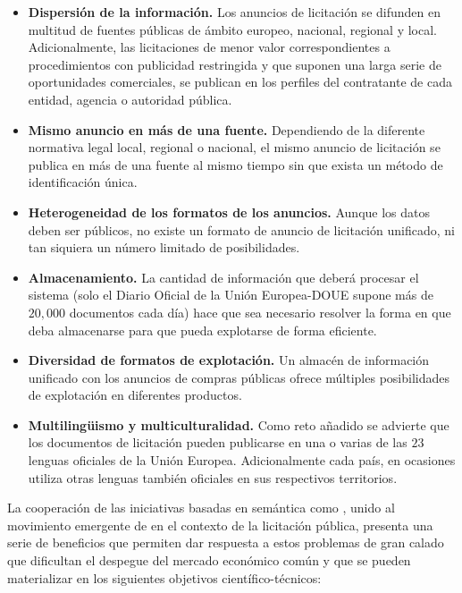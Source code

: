 \documentclass[a4paper,final,11pt,fleqn,twoside]{book}  %
\begin{document}
\begin{itemize}
\item \textbf{Dispersión de la información.} Los anuncios de licitación se difunden en multitud de fuentes
públicas de ámbito europeo, nacional, regional y local. Adicionalmente, las licitaciones de menor
valor correspondientes a procedimientos con publicidad restringida y que suponen una larga
serie de oportunidades comerciales, se publican en los perfiles del contratante de cada
entidad, agencia o autoridad pública. 

\item \textbf{Mismo anuncio en más de una fuente.} Dependiendo de la diferente normativa legal local,
regional o nacional, el mismo anuncio de licitación se publica en más de una fuente al
mismo tiempo sin que exista un método de identificación única.

\item \textbf{Heterogeneidad de los formatos de los anuncios.} Aunque los datos deben ser públicos, no
existe un formato de anuncio de licitación unificado, ni tan siquiera un número limitado de
posibilidades.

\item \textbf{Almacenamiento.} La cantidad de información que deberá procesar el sistema (solo el Diario
Oficial de la Unión Europea-DOUE supone más de $20,000$ documentos cada día) hace que sea necesario resolver la forma en que
deba almacenarse para que pueda explotarse de forma eficiente.

\item \textbf{Diversidad de formatos de explotación.} Un almacén de información unificado con los
anuncios de compras públicas ofrece múltiples posibilidades de explotación en diferentes
productos. 

\item \textbf{Multiling\"{u}ismo y multiculturalidad.} Como reto añadido se advierte que los documentos de
licitación pueden publicarse en una o varias de las $23$ lenguas oficiales de la Unión Europea.
Adicionalmente cada país, en ocasiones utiliza otras lenguas también oficiales en sus respectivos territorios. 
\end{itemize}

La cooperación de las iniciativas basadas en semántica como \linkeddata, unido al movimiento emergente
de \opendata en el contexto de la licitación pública, presenta una serie de beneficios que permiten
dar respuesta a estos problemas de gran calado que dificultan el despegue del mercado económico común y que se 
pueden materializar en los siguientes objetivos científico-técnicos:
\end{document}
